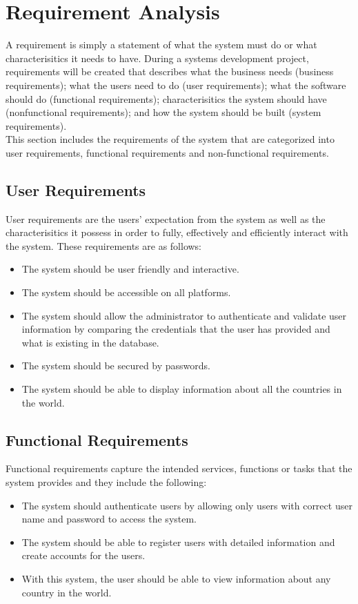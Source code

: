 \documentclass[twoside, a4paper, 12pt]{report}
\begin{document}
\section{Requirement Analysis}
A requirement is simply a statement of what the system must do or what characterisitics it needs to have. During a systems development project, requirements will be created that describes what the business needs (business requirements); what the users need to do (user requirements); what the software should do (functional requirements); characterisitics the system should have (nonfunctional requirements); and how the system should be built (system requirements).\\
\indent
This section includes the requirements of the system that are categorized into user requirements, functional requirements and non-functional requirements.

\subsection{User Requirements}
User requirements are the users' expectation from the system as well as the characterisitics it possess in order to fully, effectively and efficiently interact with the system. These requirements are as follows:
\begin{itemize}
	\item The system should be user friendly and interactive.
	\item The system should be accessible on all platforms.
	\item The system should allow the administrator to authenticate and validate user information by comparing the credentials that the user has provided and what is existing in the database.
	\item The system should be secured by passwords.
	\item The system should be able to display information about all the countries in the world.
\end{itemize}

\subsection{Functional Requirements}
Functional requirements capture the intended services, functions or tasks that the system provides and they include the following:
\begin{itemize}
	\item The system should authenticate users by allowing only users with correct user name and password to access the system.
	\item The system should be able to register users with detailed information and create accounts for the users.
	\item With this system, the user should be able to view information about any country in the world.
\end{itemize}
\end{document}
